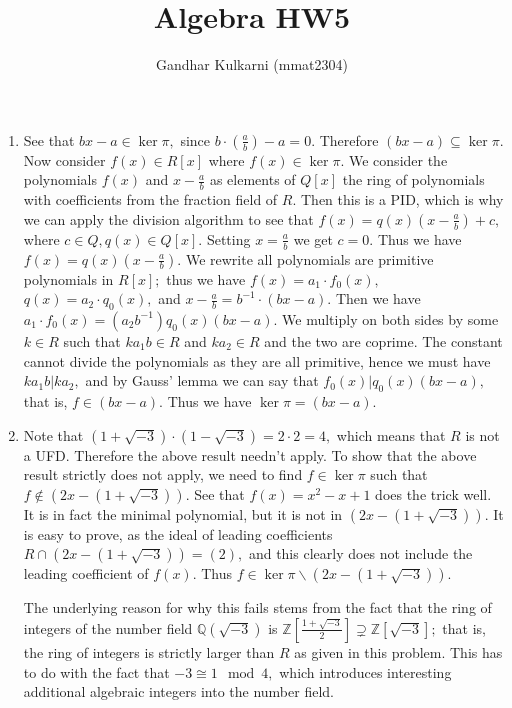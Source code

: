 \documentclass{article}
\title{Algebra HW5} %
\author{Gandhar Kulkarni (mmat2304)} %
\date{} %
\begin{document}
\maketitle %


\section{} %
\begin{enumerate}
	\item See that $bx-a \in \ker \pi,$ since $b \cdot \left( \frac{a}{b} \right)-a=0.$ Therefore $(bx-a) \subseteq \ker \pi.$ Now consider $f(x) \in R[x]$ 
	where $f(x) \in \ker \pi.$ We consider the polynomials $f(x)$ and $x-\frac{a}{b}$ as elements of $Q[x]$ the ring of polynomials with coefficients from 
	the fraction field of $R.$ Then this is a PID, which is why we can apply the division algorithm to see that $f(x)=q(x)\left(x-\frac{a}{b}\right)+c,$ 
	where $c \in Q, q(x) \in Q[x].$ Setting $x=\frac{a}{b}$ we get $c=0.$ Thus we have $f(x)=q(x)\left(x-\frac{a}{b}\right).$ We rewrite all polynomials are 
	primitive polynomials in $R[x];$ thus we have $f(x)=a_1 \cdot f_0(x),$ $q(x)=a_2 \cdot q_0(x),$ and $x-\frac{a}{b}=b^{-1} \cdot (bx-a).$ Then we have $ 
	a_1 \cdot f_0(x)= (a_2b^{-1}) q_0(x) (bx-a).$ We multiply on both sides by some $k \in R$ such that $ka_1b \in R $ and $ ka_2 \in R$ and the two are 
	coprime. The constant cannot divide the polynomials as they are all primitive, hence we must have $ka_1b  |  ka_2,$ and by Gauss' lemma we can say that 
	$f_0(x) | q_0(x)(bx-a),$ that is, $f \in (bx-a).$ Thus we have $\ker \pi=(bx-a).$
	
	\item Note that $(1+\sqrt{-3})\cdot (1-\sqrt{-3})=2 \cdot 2 = 4,$ which means that $R$ is not a UFD. Therefore the above result needn't apply. To show 
	that the above result strictly does not apply, we need to find $f \in \ker \pi$ such that $f \notin (2x-(1+\sqrt{-3})).$ See that $f(x)=x^2-x+1$ does 
	the trick well. It is in fact the minimal polynomial, but it is not in $(2x-(1+\sqrt{-3})).$ It is easy to prove, as the ideal of leading coefficients 
	$R \cap (2x-(1+\sqrt{-3}))=(2),$ and this clearly does not include the leading coefficient of $f(x).$ Thus $f \in \ker \pi \backslash 
	(2x-(1+\sqrt{-3})).$
	
	The underlying reason for why this fails stems from the fact that the ring of integers of the number field $\mathbb{Q}(\sqrt{-3})$ is $\mathbb{Z}\left[ 
	\frac{1+\sqrt{-3}}{2}\right] \supsetneq \mathbb{Z}[\sqrt{-3}];$ that is, the ring of integers is strictly larger than $R$ as given in this problem. This 
	has to do with the fact that $-3 \cong 1 \mod 4,$ which introduces interesting additional algebraic integers into the number field. 
\end{enumerate}
\end{document}
